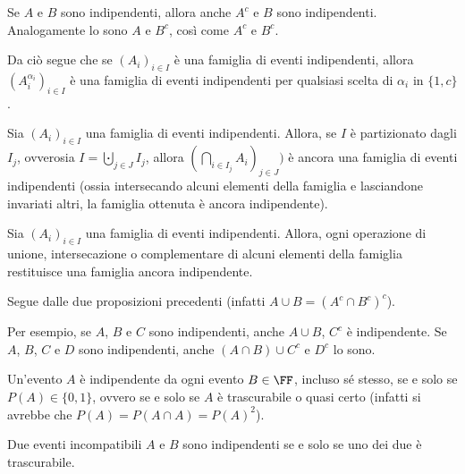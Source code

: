 \begin{multicols*}{2}
    \begin{proposition}
        Se $A$ e $B$ sono indipendenti, allora anche
        $A^c$ e $B$ sono indipendenti. Analogamente
        lo sono $A$ e $B^c$, così come
        $A^c$ e $B^c$.


        Da ciò segue che se $(A_i)_{i \in I}$ è una famiglia di eventi
        indipendenti, allora $(A_i^{\alpha_i})_{i \in I}$ è una famiglia
        di eventi indipendenti per qualsiasi scelta di $\alpha_i$ in
        $\{1, c\}$.
    \end{proposition}

    \begin{proposition}
        Sia $(A_i)_{i \in I}$ una famiglia di eventi indipendenti. Allora,
        se $I$ è partizionato dagli $I_j$, ovverosia $I = \bigcupdot_{j \in J} I_j$,
        allora $(\bigcap_{i \in I_j} A_{i})_{j \in J})$ è ancora una famiglia
        di eventi indipendenti (ossia intersecando alcuni elementi della famiglia
        e lasciandone invariati altri, la famiglia ottenuta è ancora indipendente).
    \end{proposition}

    \begin{theorem}
        Sia $(A_i)_{i \in I}$ una famiglia di eventi indipendenti. Allora,
        ogni operazione di unione, intersecazione o complementare di alcuni elementi della famiglia restituisce una famiglia ancora indipendente. \smallskip

        Segue dalle due proposizioni precedenti (infatti $A \cup B = (A^c \cap B^c)^c$).
    \end{theorem}

    \begin{example}
        Per esempio, se $A$, $B$ e $C$ sono indipendenti, anche $A \cup B$, $C^c$
        è indipendente. Se $A$, $B$, $C$ e $D$ sono indipendenti, anche
        $(A \cap B) \cup C^c$ e $D^c$ lo sono.
    \end{example}

    \begin{remark}
        Un'evento $A$ è indipendente da ogni evento $B \in \FF$, incluso
        sé stesso, se e solo se $P(A) \in \{0, 1\}$, ovvero se e solo
        se $A$ è trascurabile o quasi certo (infatti si avrebbe che
        $P(A) = P(A \cap A) = P(A)^2$).
    \end{remark}

    \begin{remark}
        Due eventi incompatibili $A$ e $B$ sono indipendenti se e solo se
        uno dei due è trascurabile.
    \end{remark}
\end{multicols*}
